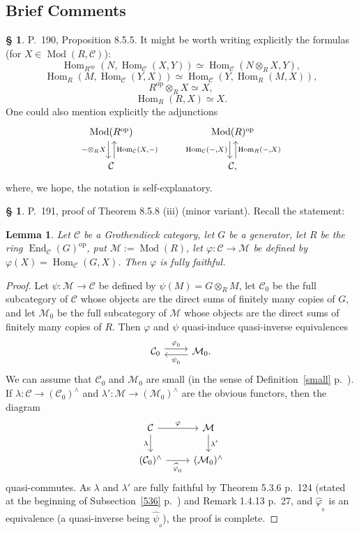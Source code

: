 \documentclass[12pt]{article}
\newtheorem{lem}[thm]{Lemma}
\theoremstyle{remark}
\theoremstyle{definition}
\newtheorem{s}[thm]{\S}
\newcommand{\C}{\mathcal C}
\newcommand{\M}{\mathcal M}
\newcommand{\mv}{ (minor variant)}
\DeclareMathOperator{\Hom}{Hom}%
\DeclareMathOperator{\Mod}{Mod}
\DeclareMathOperator{\op}{op}
\begin{document}
\subsection{Brief Comments}
%
\begin{s} P.~190, Proposition 8.5.5. It might be worth writing explicitly the formulas (for $X\in\Mod(R,\C)$):
$$
\Hom_{R^{\op}}(N,\Hom_\C(X,Y))\simeq
\Hom_\C\left(N\otimes_RX,Y\right),
$$
$$
\Hom_R(M,\Hom_\C(Y,X))\simeq
\Hom_\C\left(Y,\Hom_R(M,X)\right),
$$
$$
R^{\op}\otimes_RX\simeq X,
$$
$$
\Hom_R(R,X)\simeq X.
$$
One could also mention explicitly the adjunctions
$$
\begin{tikzcd}
\Mod(R^{\op})\ar[xshift=-0.7ex]{d}[swap]{-\otimes_RX}&&&
\Mod(R)^{\op}\ar[xshift=-0.7ex]{d}[swap]{\Hom_\C(-,X)}\\
\C\ar[xshift=0.7ex]{u}[swap]{\Hom_\C(X,-)}&&&\C,\ar[xshift=0.7ex]{u}[swap]{\Hom_R(-,X)}
\end{tikzcd}
$$
where, we hope, the notation is self-explanatory.
\end{s}
%
%
\begin{s} P.~191, proof of Theorem 8.5.8 (iii)\mv. Recall the statement: 
%
\begin{lem}\label{858iii}
%
Let $\C$ be a Grothendieck category, let $G$ be a generator, let $R$ be the ring $\operatorname{End}_\C(G)^{\op}$, put $\M:=\Mod(R)$, let $\varphi:\C\to\M$ be defined by $\varphi(X)=\Hom_\C(G,X)$. Then $\varphi$ is fully faithful. 
%
\end{lem}
%
\begin{proof}
Let $\psi:\M\to\C$ be defined by $\psi(M)=G\otimes_RM$, let $\C_0$ be the full subcategory of $\C$ whose objects are the direct sums of finitely many copies of $G$, and let $\M_0$ be the full subcategory of $\M$ whose objects are the direct sums of finitely many copies of $R$. Then $\varphi$ and $\psi$ quasi-induce quasi-inverse equivalences 
$$
\begin{tikzcd}
\C_0\ar[yshift=.7ex]{r}{\varphi_{{}_0}}&\M_0.\ar[yshift=-.7ex]{l}{\psi_{{}_0}}
\end{tikzcd}
$$ 
We can assume that $\C_0$ and $\M_0$ are small (in the sense of Definition~\ref{small} p.~\pageref{small}). If $\lambda:\C\to(\C_0)^\wedge$ and $\lambda':\M\to(\M_0)^\wedge$ are the obvious functors, then the diagram 
$$
\begin{tikzcd}
\C\ar{r}{\varphi}\ar{d}[swap]{\lambda}&\M\ar{d}{\lambda'}\\
(\C_0)^\wedge\ar{r}[swap]{\widehat\varphi_{{}_0}}&(\M_0)^\wedge
\end{tikzcd}
$$ 
quasi-commutes. As $\lambda$ and $\lambda'$ are fully faithful by Theorem 5.3.6 p.~124 (stated at the beginning of Subsection~\ref{536} p.~\pageref{536}) and Remark 1.4.13 p.~27, and $\widehat\varphi_{{}_0}$ is an equivalence (a quasi-inverse being $\widehat\psi_{{}_0}$), the proof is complete.
\end{proof}
\end{s}
\end{document}
